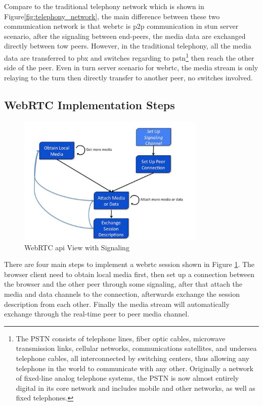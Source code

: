 \par Compare to the traditional telephony network which is shown in Figure\ref{fig:telephony_network}\cite{web:teleVSvoip}, the main difference between these two communication network is that \gls{webrtc} is \gls{p2p} communication in \gls{stun} server scenario, after the signaling between end-peers, the media data are exchanged directly between tow peers. However, in the traditional telephony, all the media data are transferred to \gls{pbx} and switches regarding to \gls{pstn}\footnote{The PSTN consists of telephone lines, fiber optic cables, microwave transmission links, cellular networks, communications satellites, and undersea telephone cables, all interconnected by switching centers, thus allowing any telephone in the world to communicate with any other. Originally a network of fixed-line analog telephone systems, the PSTN is now almost entirely digital in its core network and includes mobile and other networks, as well as fixed telephones.\cite{wiki:pstn}} then reach the other side of the peer. Even in \gls{turn} server scenario for \gls{webrtc}, the media stream is only relaying to the \gls{turn} then directly transfer to another peer, no switches involved.

\subsection{WebRTC Implementation Steps}

\begin{figure}
	\centering
    	\includegraphics[width=0.80\textwidth,natwidth=610,natheight=642]{figs/webrtcApis.png}
  	\caption{WebRTC \gls{api} View with Signaling\cite{inbook:rtc-apis}}
  	\label{fig:webrtc_4steps}
\end{figure}

\noindent There are four main steps to implement a \gls{webrtc} session shown in Figure \ref{fig:webrtc_4steps}. The browser client need to obtain local media first, then set up a connection between the browser and the other peer through some signaling, after that attach the media and data channels to the connection, afterwards exchange the session description from each other. Finally the media stream will automatically exchange through the real-time peer to peer media channel.

